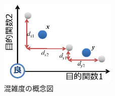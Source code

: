 \begin{figure}[ht]
    \begin{center}
        \includegraphics[width=0.5\textwidth,keepaspectratio=true]{fig/theory_crowding_distance.eps}
    \end{center}
    \caption{混雑度の概念図}
    \label{fig::theory_crowding_distance}
\end{figure}

